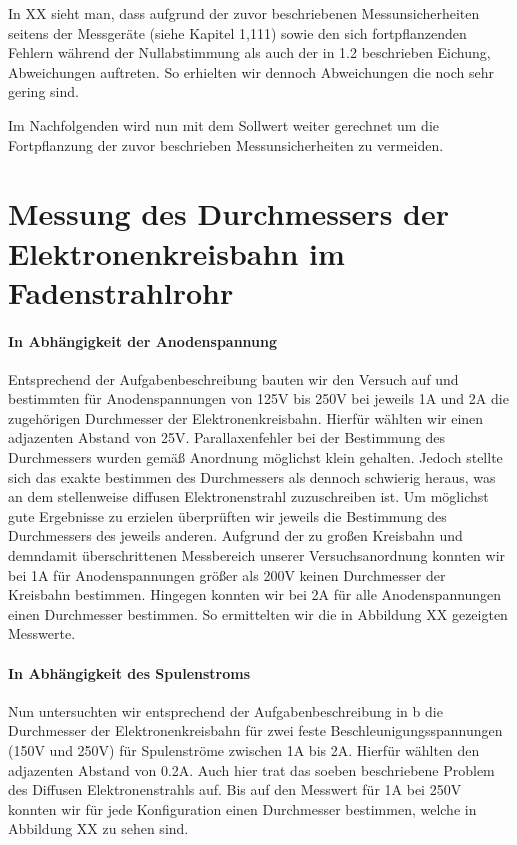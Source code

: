  In XX sieht man, dass aufgrund der zuvor beschriebenen Messunsicherheiten seitens der Messgeräte (siehe Kapitel 1,111) sowie den sich fortpflanzenden Fehlern während der Nullabstimmung als auch der in 1.2 beschrieben Eichung, Abweichungen auftreten. So erhielten wir dennoch Abweichungen die noch sehr gering sind.
 
 Im Nachfolgenden wird nun mit dem Sollwert weiter gerechnet um die Fortpflanzung der zuvor beschrieben Messunsicherheiten zu vermeiden.
 
 
\section{Messung des Durchmessers der Elektronenkreisbahn im Fadenstrahlrohr}
\paragraph{In Abhängigkeit der Anodenspannung}
Entsprechend der Aufgabenbeschreibung bauten wir den Versuch auf und bestimmten für Anodenspannungen von 125V bis 250V bei jeweils 1A und 2A die zugehörigen Durchmesser der Elektronenkreisbahn. Hierfür wählten wir einen adjazenten Abstand von 25V. Parallaxenfehler bei der Bestimmung des Durchmessers wurden gemäß Anordnung möglichst klein gehalten. Jedoch stellte sich das exakte bestimmen des Durchmessers als dennoch schwierig heraus, was an dem stellenweise diffusen Elektronenstrahl zuzuschreiben ist. Um möglichst gute Ergebnisse zu erzielen überprüften wir jeweils die Bestimmung des Durchmessers des jeweils anderen. Aufgrund der zu großen Kreisbahn und demndamit überschrittenen Messbereich unserer Versuchsanordnung konnten wir bei 1A für Anodenspannungen größer als 200V keinen Durchmesser der Kreisbahn bestimmen. Hingegen konnten wir bei 2A für alle Anodenspannungen einen Durchmesser bestimmen. So ermittelten wir die in Abbildung XX gezeigten Messwerte. 




\paragraph{In Abhängigkeit des Spulenstroms}
Nun untersuchten wir entsprechend der Aufgabenbeschreibung in b die  Durchmesser der Elektronenkreisbahn für zwei feste Beschleunigungsspannungen (150V und 250V) für Spulenströme zwischen 1A bis 2A. Hierfür wählten den adjazenten Abstand von 0.2A. Auch hier trat das soeben beschriebene Problem des Diffusen Elektronenstrahls auf. Bis auf den Messwert für 1A bei 250V konnten wir für jede Konfiguration einen Durchmesser bestimmen, welche in Abbildung XX zu sehen sind.






